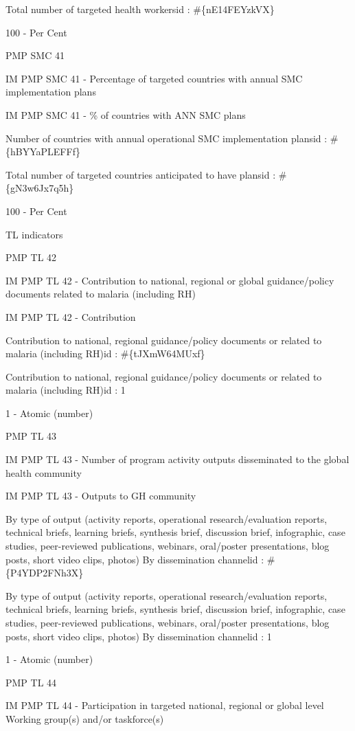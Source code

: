 \documentclass[]{book}
\begin{document}
Total number of targeted health workersid : \#\{nE14FEYzkVX\}

100 - Per Cent

PMP SMC 41

IM PMP SMC 41 - Percentage of targeted countries with annual SMC implementation plans

IM PMP SMC 41 - \% of countries with ANN SMC plans

Number of countries with annual operational SMC implementation plansid : \#\{hBYYaPLEFFf\}

Total number of targeted countries anticipated to have plansid : \#\{gN3w6Jx7q5h\}

100 - Per Cent

TL indicators

PMP TL 42

IM PMP TL 42 - Contribution to national, regional or global guidance/policy documents related to malaria (including RH)

IM PMP TL 42 - Contribution

Contribution to national, regional guidance/policy documents or related to malaria (including RH)id : \#\{tJXmW64MUxf\}

Contribution to national, regional guidance/policy documents or related to malaria (including RH)id : 1

1 - Atomic (number)

PMP TL 43

IM PMP TL 43 - Number of program activity outputs disseminated to the global health community

IM PMP TL 43 - Outputs to GH community

By type of output (activity reports, operational research/evaluation reports, technical briefs, learning briefs, synthesis brief, discussion brief, infographic, case studies, peer-reviewed publications, webinars, oral/poster presentations, blog posts, short video clips, photos) By dissemination channelid : \#\{P4YDP2FNh3X\}

By type of output (activity reports, operational research/evaluation reports, technical briefs, learning briefs, synthesis brief, discussion brief, infographic, case studies, peer-reviewed publications, webinars, oral/poster presentations, blog posts, short video clips, photos) By dissemination channelid : 1

1 - Atomic (number)

PMP TL 44

IM PMP TL 44 - Participation in targeted national, regional or global level Working group(s) and/or taskforce(s)
\end{document}
